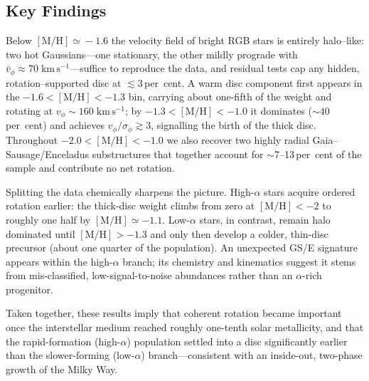 \documentclass[a4paper,10pt]{article}
\begin{document}
\begin{multicols}{2}
\subsection*{Key Findings}

Below $\mathrm{[M/H]}\!\simeq\!-1.6$ the velocity field of bright RGB stars is entirely halo–like: two hot Gaussians—one stationary, the other mildly prograde with $\bar{v}_{\phi}\!\approx\!70\;\mathrm{km\,s^{-1}}$—suffice to reproduce the data, and residual tests cap any hidden, rotation–supported disc at $\lesssim3$\,per~cent.  A warm disc component first appears in the $-1.6<\mathrm{[M/H]}<-1.3$ bin, carrying about one-fifth of the weight and rotating at $v_{\phi}\!\sim\!160\;\mathrm{km\,s^{-1}}$; by $-1.3<\mathrm{[M/H]}<-1.0$ it dominates ($\sim40$\,per~cent) and achieves $v_{\phi}/\sigma_{\phi}\!\gtrsim\!3$, signalling the birth of the thick disc.  Throughout $-2.0<\mathrm{[M/H]}<-1.0$ we also recover two highly radial Gaia–Sausage/Enceladus substructures that together account for $\sim$7–13\,per~cent of the sample and contribute no net rotation.

Splitting the data chemically sharpens the picture.  High-$\alpha$ stars acquire ordered rotation earlier: the thick-disc weight climbs from zero at $\mathrm{[M/H]}<-2$ to roughly one half by $\mathrm{[M/H]}\simeq-1.1$.  Low-$\alpha$ stars, in contrast, remain halo dominated until $\mathrm{[M/H]}>-1.3$ and only then develop a colder, thin-disc precursor (about one quarter of the population).  An unexpected GS/E signature appears within the high-$\alpha$ branch; its chemistry and kinematics suggest it stems from mis-classified, low-signal-to-noise abundances rather than an $\alpha$-rich progenitor.

Taken together, these results imply that coherent rotation became important once the interstellar medium reached roughly one-tenth solar metallicity, and that the rapid-formation (high-$\alpha$) population settled into a disc significantly earlier than the slower-forming (low-$\alpha$) branch—consistent with an inside-out, two-phase growth of the Milky Way.






\end{multicols}
\end{document}
